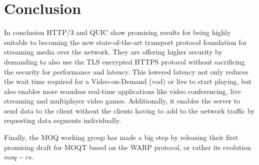 \documentclass[conference]{IEEEtran}
\begin{document}
\section{Conclusion}
In conclusion HTTP/3 and QUIC show promising results for being highly suitable to becoming the new state-of-the-art transport protocol foundation for streaming media over the network. They are offering higher security by demanding to also use the TLS encrypted HTTPS protocol without sacrificing the security for performance and latency. This lowered latency not only reduces the wait time required for a Video-on-Demand (vod) or live to start playing, but also enables more seamless real-time applications like video conferencing, live streaming and multiplayer video games. Additionally, it enables the server to send data to the client without the clients having to add to the network traffic by requesting data segments individually.

Finally, the MOQ working group has made a big step by releasing their first promising draft for MOQT based on the WARP protocol, or rather its evolution $moq-rs$.
\end{document}
